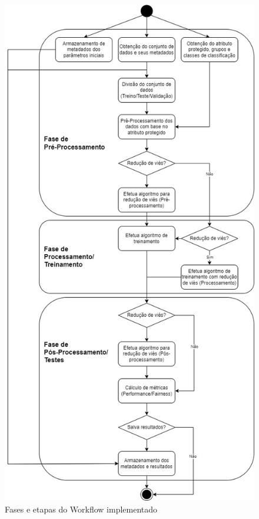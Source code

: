 \documentclass[portugues]{ic-tese}
\begin{document}
\begin{figure}[H]
\centering
\includegraphics[scale=0.4]{images/ml-fairness-pipeline.jpg}
\caption {Fases e etapas do Workflow implementado}
\label{fig:FairnessPipeline}
\end{figure}
\end{document}
